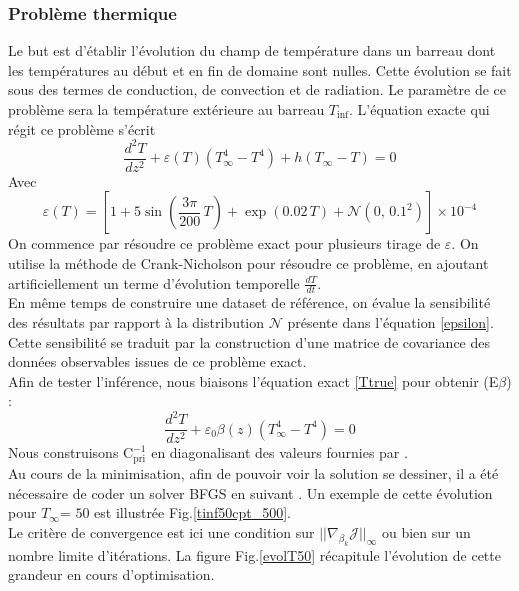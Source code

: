 \documentclass[a4paper,12pt]{article}
\newcommand{\bepar}[1]{
	\left( #1 \right)  
}
\newcommand{\becro}[1]{
	\left[ #1 \right]  
}
\newcommand{\covpri}{\text{C}^{-1}_{\text{pri}}}
\newcommand{\J}{\mathcal{J}}
\newcommand{\tinf}{$T_\infty$}
\newcommand\bk{\color{black}}
\newcommand\dsb{\color{dsb}}
\numberwithin{equation}{section} %
\begin{document}
\dsb \subsubsection{Problème thermique} \bk
Le but est d'établir l'évolution du champ de température dans un barreau dont les températures au début et en fin de domaine sont nulles. Cette évolution se fait sous des termes de conduction, de convection et de radiation. Le paramètre de ce problème sera la température extérieure au barreau $T_\text{inf}$. 
L'équation exacte qui régit ce problème s'écrit 
\begin{equation}
 \frac{d^2T}{dz^2} + \varepsilon(T)\bepar{T^4_\infty - T^4} + h\bepar{T_\infty - T} = 0 \label{Ttrue} \tag{EE}
 \end{equation} 
 Avec 
 \begin{equation}
 \varepsilon(T) = \becro{1 + 5 \sin\bepar{\frac{3\pi}{200}\, T} + \exp\bepar{0.02\,T}+ \mathcal{N}\bepar{0,\, 0.1^2}} \times 10^{-4} \label{epsilon}
 \end{equation}
 On commence par résoudre ce problème exact pour plusieurs tirage de $\varepsilon$. On utilise la méthode de Crank-Nicholson pour résoudre ce problème, en ajoutant artificiellement un terme d'évolution temporelle $\displaystyle \frac{dT}{dt}$.\\
 En même temps de construire une dataset de référence, on évalue la sensibilité des résultats par rapport à la distribution $\mathcal{N}$ présente dans l'équation \eqref{epsilon}. Cette sensibilité se traduit par la construction d'une matrice de covariance des données observables issues de ce problème exact.\\
 Afin de tester l'inférence, nous biaisons l'équation exact \eqref{Ttrue} pour obtenir (E$\beta$) :
\begin{equation}
\frac{d^2T}{dz^2} + \varepsilon_0\beta(z)\bepar{T^4_\infty - T^4}= 0 \tag{E$\beta$} \label{Tinex}
\end{equation}
Nous construisons $\covpri$ en diagonalisant des valeurs fournies par \citep{parish2016paradigm}.\\

\noindent Au cours de la minimisation,  afin de pouvoir voir la solution se dessiner, il a été nécessaire de coder un solver BFGS en suivant \citep{nocedal2006numerical}. Un exemple de cette évolution pour \tinf = $50$ est illustrée Fig.\eqref{tinf50cpt_500}.\\
Le critère de convergence est ici une condition sur $||\nabla_{\beta_k}\J||_\infty$ ou bien sur un nombre limite d'itérations. La figure Fig.\eqref{evolT50} récapitule l'évolution de cette grandeur en cours d'optimisation.\\
\end{document}

